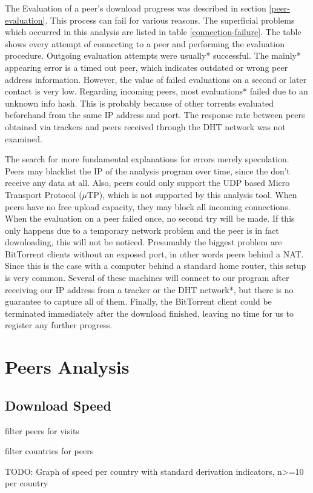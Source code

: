 \documentclass[10pt, a4paper, twoside, headsepline]{scrbook}
\renewcommand{\_}{\origunderscore\allowbreak}
\begin{document}
The Evaluation of a peer's download progress was described in section \ref{peer-evaluation}. This process can fail for various reasons. The superficial problems which occurred in this analysis are listed in table \ref{connection-failure}. The table shows every attempt of connecting to a peer and performing the evaluation procedure. Outgoing evaluation attempts were usually* successful. The mainly* appearing error is a timed out peer, which indicates outdated or wrong peer address information. However, the value of failed evaluations on a second or later contact is very low. Regarding incoming peers, most evaluations* failed due to an unknown info hash. This is probably because of other torrents evaluated beforehand from the same IP address and port. The response rate between peers obtained via trackers and peers received through the DHT network was not examined.

The search for more fundamental explanations for errors merely speculation. Peers may blacklist the IP of the analysis program over time, since the don't receive any data at all. Also, peers could only support the UDP based Micro Transport Protocol ($\mu$TP), which is not supported by this analysis tool. When peers have no free upload capacity, they may block all incoming connections. When the evaluation on a peer failed once, no second try will be made. If this only happens due to a temporary network problem and the peer is in fact downloading, this will not be noticed. Presumably the biggest problem are BitTorrent clients without an exposed port, in other words peers behind a NAT. Since this is the case with a computer behind a standard home router, this setup is very common. Several of these machines will connect to our program after receiving our IP address from a tracker or the DHT network*, but there is no guarantee to capture all of them. Finally, the BitTorrent client could be terminated immediately after the download finished, leaving no time for us to register any further progress.

\section{Peers Analysis}
\subsection{Download Speed}
filter peers for visits

filter countries for peers

TODO: Graph of speed per country with standard derivation indicators, n>=10 per country
\end{document}
